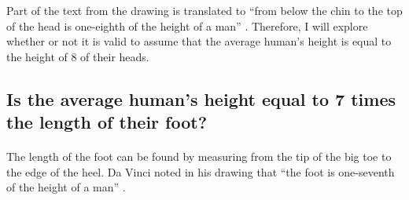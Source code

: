 \documentclass[]{article}
\begin{document}
Part of the text from the drawing is translated to ``from below the chin
to the top of the head is one-eighth of the height of a man''
\citep{Wikipedia:Vitruvian}. Therefore, I will explore whether or not it
is valid to assume that the average human's height is equal to the
height of 8 of their heads.

\subsection{Is the average human's height equal to 7 times the length of their foot?}
\label{sec:rq4}
\paragraph{}

The length of the foot can be found by measuring from the tip of the big
toe to the edge of the heel. Da Vinci noted in his drawing that ``the
foot is one-seventh of the height of a man''
\citep{Wikipedia:Vitruvian}.
\end{document}
